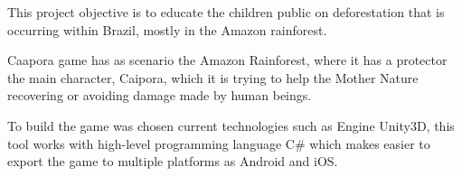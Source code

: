 This project objective  is to educate the children public on deforestation that is occurring within Brazil, mostly in the Amazon rainforest.

Caapora game has as scenario the Amazon Rainforest, where it has a protector the main character, Caipora, which it is trying to help the Mother Nature recovering or avoiding damage made by human beings.

To build the game was chosen current technologies such as  Engine Unity3D, this tool works with high-level programming language C\# which makes easier to export the game to multiple platforms as Android and iOS.

